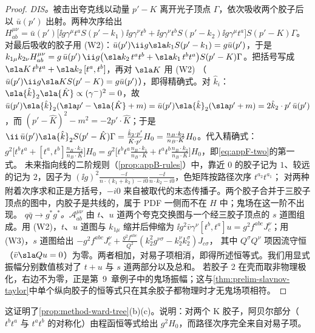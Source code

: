 \begin{proof}
\emph{DIS。}被击出夸克线以动量 $p'-K$ 离开光子顶点 $\Gamma$，依次吸收两个胶子后以 $\bar u(p')$ 出射。两种次序给出
$H^{\mu\nu}_{ab}=\bar u(p')\bigl[\ii g\gamma^\mu t^aS(p'-k_1)\ii g\gamma^\nu t^b+\ii g\gamma^\nu t^bS(p'-k_2)\ii g\gamma^\mu t^a\bigr]S(p'-K)\Gamma$。
对最后吸收的胶子用 (W2)：$\bar u(p')\ii g\sla k_1S(p'-k_1)=g\bar u(p')$，于是
$k_{1\mu}k_{2\nu}H^{\mu\nu}_{ab}=g\,\bar u(p')\,\ii g\bigl(\sla k_2\,t^at^b+\sla k_1\,t^bt^a\bigr)S(p'-K)\Gamma$。把括号写成 $\sla K\,t^bt^a+\sla k_2\,[t^a,t^b]$，再对 $\sla K$ 用 (W2)
（$\bar u(p')\ii g\sla KS(p'-K)=g\bar u(p')$），即得精确式。对 $\hat k_i$：$\sla{\hat k}_2\sla{\hat K}\propto(\gamma^-)^2=0$，故
$\bar u(p')\sla{\hat k}_2(\sla p'-\sla{\hat K}+m)=\bar u(p')\sla{\hat k}_2(\sla p'+m)=2\hat k_2\cdot p'\,\bar u(p')$，而 $(p'-\hat K)^2-m^2=-2p'\cdot\hat K$；于是
$\ii\,\bar u(p')\sla{\hat k}_2S(p'-\hat K)\Gamma=\frac{\hat k_2\cdot p'}{\hat K\cdot p'}H_0=\frac{n_B\cdot k_2}{n_B\cdot K}H_0$。代入精确式：
$g^2\bigl[t^bt^a+[t^a,t^b]\frac{n_B\cdot k_2}{n_B\cdot K}\bigr]H_0=g^2\bigl[t^bt^a\frac{n_B\cdot k_1}{n_B\cdot K}+t^at^b\frac{n_B\cdot k_2}{n_B\cdot K}\bigr]H_0$，即\cref{eq:appF-two}的第一式。
未来指向线的二阶规则（\cref{prop:appB-rules}）中，靠近 $0$ 的胶子记为 $1$、较远的记为 $2$，因子为 $(\ii g)^2\frac{-\ii}{n\cdot(k_1+k_2)-i0}\frac{-\ii}{n\cdot k_2-i0}$，色矩阵按路径次序 $t^{a_2}t^{a_1}$；
对两种附着次序求和正是方括号，$-i0$ 来自被取代的末态传播子。两个胶子合并于三胶子顶点的图中，内胶子是共线的，属于 PDF 一侧而不在 $H$ 中；鬼场在这一阶不出现。
\emph{$q\bar q\to g^*g^*$。}$\mathcal A^{\mu\nu}_{ab}$ 由 $t$、$u$ 道两个夸克交换图与一个经三胶子顶点的 $s$ 道图组成。用 (W2)，$t$、$u$ 道图与 $k_{1\mu}$ 缩并后伸缩为
$\ii g^2\bar v\gamma^\nu[t^b,t^a]u=g^2f^{abc}J_c^\nu$；用 (W3)，$s$ 道图给出 $-g^2f^{abc}J_c^\nu+\frac{g^2f^{abc}}{Q^2}(k_2^2g^{\nu\sigma}-k_2^\nu k_2^\sigma)J_{c\sigma}$，
其中 $Q^\sigma Q^\nu$ 项因流守恒（$\bar v\sla Qu=0$）为零。两者相加，对易子项相消，即得所述恒等式。我们用显式振幅分别数值核对了 $t+u$ 与 $s$ 道两部分以及总和。%
若胶子 2 在壳而取非物理极化，右边不为零，正是第~9~章例子中的鬼场振幅；这与\cref{thm:prelim-slavnov-taylor}中单个纵向胶子的恒等式只在其余胶子都物理时才无鬼场项相符。
\end{proof}

这证明了\cref{prop:method-ward-tree}(b)(c)。说明：对两个 K 胶子，阿贝尔部分（$t^bt^a$ 与 $t^at^b$ 的对称化）由程函恒等式给出 $g^2H_0$，而路径次序完全来自对易子项。

